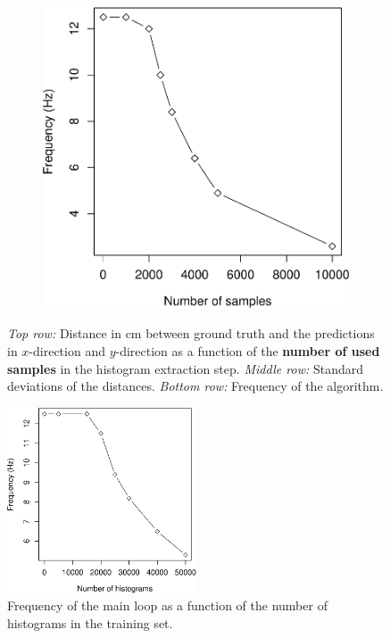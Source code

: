 \documentclass[11pt]{report}
\begin{document}
\begin{figure}[H]
\begin{subfigure}[b]{0.45\textwidth}
  \end{subfigure}
\par\bigskip %
  \begin{subfigure}[b]{0.45\textwidth}
  \includegraphics[width=1\textwidth]{samples_vs_freq-crop}
  \end{subfigure}
  \caption{\emph{Top row:} Distance in cm between ground truth and the
    predictions in $x$-direction and $y$-direction as a function of
    the \textbf{number of used samples} in the histogram extraction
    step. \emph{Middle row:} Standard deviations of the
    distances. \emph{Bottom row:} Frequency of the algorithm.}
  \label{fig:tradesamples}
\end{figure}

\begin{figure}[H]
  \centering
\includegraphics[width=0.5\textwidth]{histograms_vs_freq-crop}
  \caption{Frequency of the main loop as a function of the number of
    histograms in the training set.}
  \label{fig:freqhist}
\end{figure}
\end{document}
